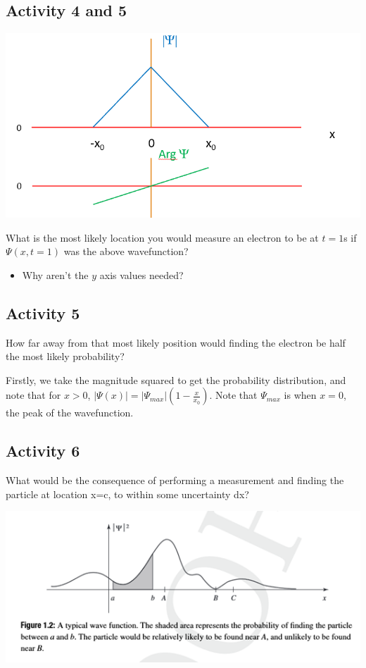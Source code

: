 \documentclass{article}
\begin{document}
\subsection{Activity 4 and 5}

\includegraphics[width = 0.7 \textwidth]{Lecture02/1.png}

What is the most likely location you would measure an electron to be at $t = 1$s if $\Psi(x,t=1)$ was the above wavefunction?

\begin{itemize}
    \item Why aren't the $y$ axis values needed?
\end{itemize}

\subsection*{Activity 5}

How far away from that most likely position would finding the electron be half the most likely probability?

Firstly, we take the magnitude squared to get the probability distribution, and note that for $x > 0$, $|\Psi(x)| = |\Psi_{max}| (1 - \frac{x}{x_0})$. Note that $\Psi_{max}$ is when $x = 0$, the peak of the wavefunction.

\subsection{Activity 6}

What would be the consequence of performing a measurement and finding the particle at location x=c, to within some uncertainty dx?

\includegraphics[width = 0.7 \textwidth]{Lecture02/2.png}
\end{document}
